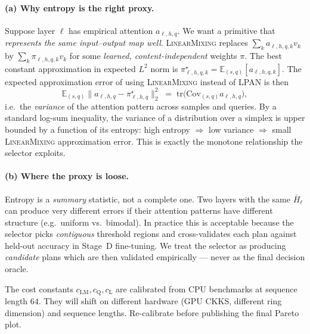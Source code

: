 \documentclass[11pt,a4paper]{article}
\newcommand{\LM}{\textsc{LinearMixing}}
\begin{document}
\paragraph{(a) Why entropy is the right proxy.}
Suppose layer $\ell$ has empirical attention $a_{\ell,h,q}$. We want
a primitive that \emph{represents the same input--output map well}.
\LM{} replaces $\sum_k a_{\ell,h,q,k} v_k$ by $\sum_k \pi_{\ell,h,q,k} v_k$
for some \emph{learned, content-independent} weights $\pi$. The best
constant approximation in expected $L^2$ norm is
$\pi^\star_{\ell,h,q,k} = \mathbb{E}_{(s,q)}[a_{\ell,h,q,k}]$. The
expected approximation error of using \LM{} instead of LPAN is then
\[
\mathbb{E}_{(s,q)}\bigl\| a_{\ell,h,q} - \pi^\star_{\ell,h,q} \bigr\|_2^2
\;=\; \mathrm{tr}\bigl(\mathrm{Cov}_{(s,q)} a_{\ell,h,q}\bigr),
\]
i.e.\ the \emph{variance} of the attention pattern across samples and
queries. By a standard log-sum inequality, the variance of a
distribution over a simplex is upper bounded by a function of its
entropy: high entropy $\Rightarrow$ low variance $\Rightarrow$ small
\LM{} approximation error. This is exactly the monotone relationship
the selector exploits.

\paragraph{(b) Where the proxy is loose.}
Entropy is a \emph{summary} statistic, not a complete one. Two layers
with the same $\bar H_\ell$ can produce very different errors if
their attention patterns have different structure (e.g.\ uniform vs.\
bimodal). In practice this is acceptable because the selector picks
\emph{contiguous} threshold regions and cross-validates each plan
against held-out accuracy in Stage~D fine-tuning. We treat the
selector as producing \emph{candidate} plans which are then validated
empirically — never as the final decision oracle.

\begin{warning}
The cost constants $c_{\text{LM}}, c_{\text{Q}}, c_{\text{L}}$ are
calibrated from CPU benchmarks at sequence length $64$. They will
shift on different hardware (GPU CKKS, different ring dimension) and
sequence lengths. Re-calibrate before publishing the final Pareto
plot.
\end{warning}
\end{document}
